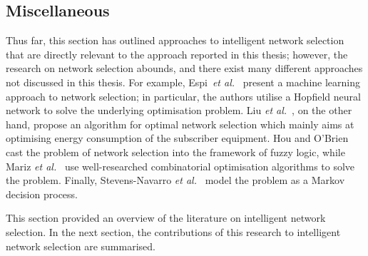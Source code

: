 
\subsection{Miscellaneous} %
\label{sub:miscellaneous_intelligent}
Thus far, this section has outlined approaches to intelligent network selection that are directly relevant to the approach reported in this thesis; however, the research on network selection abounds, and there exist many different approaches not discussed in this thesis. For example, Espi~\emph{et al.}~\cite{Espi10} present a machine learning approach to network selection; in particular, the authors utilise a Hopfield neural network to solve the underlying optimisation problem. Liu \emph{et al.}~\cite{Liu2009}, on the other hand, propose an algorithm for optimal network selection which mainly aims at optimising energy consumption of the subscriber equipment. Hou and O'Brien~\cite{Hou2006} cast the problem of network selection into the framework of fuzzy logic, while Mariz \emph{et al.}~\cite{Mariz2006} use well-researched combinatorial optimisation algorithms to solve the problem. Finally, Stevens-Navarro \emph{et al.}~\cite{StevensNavarro2008} model the problem as a Markov decision process.

This section provided an overview of the literature on intelligent network selection. In the next section, the contributions of this research to intelligent network selection are summarised.

